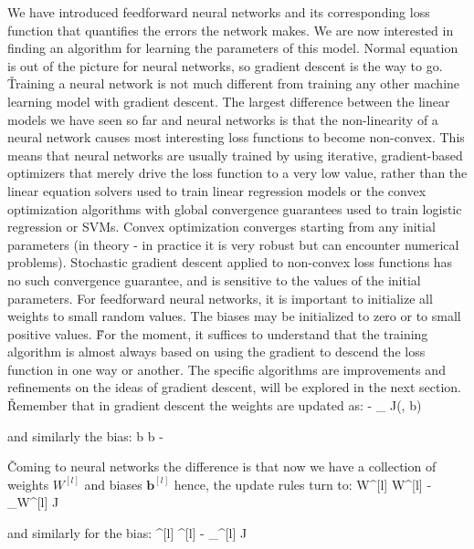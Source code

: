 We have introduced feedforward neural networks and its corresponding loss function that quantifies the errors the
network makes. We are now interested in finding an algorithm for learning the parameters of this model. Normal
equation is out of the picture for neural networks, so gradient descent is the way to go. \v

Training a neural network is not much different from training any other machine learning model with gradient descent.
The largest difference between the linear models we have seen so far and neural networks is that the non-linearity of
a neural network causes most interesting loss functions to become non-convex. This means that neural networks are
usually trained by using iterative, gradient-based optimizers that merely drive the loss function to a very low
value, rather than the linear equation solvers used to train linear regression models or the convex optimization
algorithms with global convergence guarantees used to train logistic regression or SVMs. Convex optimization
converges starting from any initial parameters (in theory - in practice it is very robust but can encounter numerical
problems). Stochastic gradient descent applied to non-convex loss functions has no such convergence guarantee, and is
sensitive to the values of the initial parameters. For feedforward neural networks, it is important to initialize all
weights to small random values. The biases may be initialized to zero or to small positive values. \v

For the moment, it suffices to understand that the training algorithm is almost always based on using the gradient to
descend the loss function in one way or another. The specific algorithms are improvements and refinements on the
ideas of gradient descent, will be explored in the next section. \v

Remember that in gradient descent the weights are updated as:
\bse
{} \coloneqq {} - \alpha \nabla_{} J(, b)
\ese

and similarly the bias:
\bse
b \coloneqq b - \alpha {}
\ese

\v

Coming to neural networks the difference is that now we have a collection of weights $W^{[l]}$ and biases
$\boldsymbol{b}^{[l]}$ hence, the update rules turn to:
\bse
W^{[l]} \coloneqq W^{[l]} - \alpha \nabla_{W^{[l]}} J
\ese

and similarly for the bias:
\bse
{}^{[l]} \coloneqq {}^{[l]} - \alpha \nabla_{^{[l]}} J
\ese

